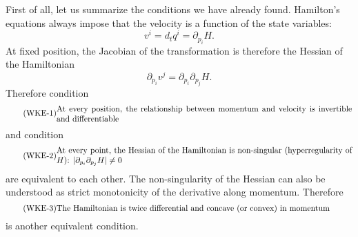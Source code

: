 First of all, let us summarize the conditions we have already found. Hamilton's equations always impose that the velocity is a function of the state variables:
\begin{equation}
	v^i = d_t q^i = \partial_{p_i} H.
\end{equation}
At fixed position, the Jacobian of the transformation is therefore the Hessian of the Hamiltonian
\begin{equation}
	\partial_{p_i} v^j = \partial_{p_i}\partial_{p_j} H.
\end{equation}
Therefore condition
\begin{equation}\label{rp-cm-wke-condVelocityFromMomentum}
	\tag{WKE-1}
	\parbox{5in}{At every position, the relationship between momentum and velocity is invertible and differentiable}
\end{equation}
and condition
\begin{equation}\label{rp-cm-wke-condHyperregularity}
	\tag{WKE-2}
	\parbox{5in}{At every point, the Hessian of the Hamiltonian is non-singular (hyperregularity of $H$): $|\partial_{p_i}\partial_{p_j} H|\neq 0$}
\end{equation}
are equivalent to each other. The non-singularity of the Hessian can also be understood as strict monotonicity of the derivative along momentum. Therefore 
\begin{equation}\label{rp-cm-wke-condConcavity}
	\tag{WKE-3}
	\parbox{5in}{The Hamiltonian is twice differential and concave (or convex) in momentum}
\end{equation}
is another equivalent condition.

